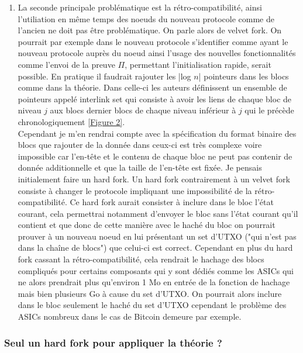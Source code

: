 \documentclass[12pt,a4paper]{article}
\newcommand{\annexe}[2]{\hyperlink{#1}{[Figure #2]}}
\begin{document}
\begin{enumerate}
	\item La seconde principale problématique est la rétro-compatibilité, ainsi l'utiliation en même temps des noeuds du nouveau protocole comme de l'ancien ne doit pas être problématique. On parle alors de velvet fork. On pourrait par exemple dans le nouveau protocole s'identifier comme ayant le nouveau protocole auprès du noeud ainsi l'usage des nouvelles fonctionnalités comme l'envoi de la preuve $\Pi$, permettant l'initialisation rapide, serait possible. En pratique il faudrait rajouter les |log $n$| pointeurs dans les blocs comme dans la théorie. Dans celle-ci les auteurs définissent un ensemble de pointeurs appelé interlink set qui consiste à avoir les liens de chaque bloc de niveau $j$ aux blocs dernier blocs de chaque niveau inférieur à $j$ qui le précède chronologiquement \annexe{22}{2}.\\ %
	Cependant je m'en rendrai compte avec la spécification du format binaire des blocs que rajouter de la donnée dans ceux-ci est très complexe voire impossible car l'en-tête et le contenu de chaque bloc ne peut pas contenir de donnée additionnelle et que la taille de l'en-tête est fixée. Je pensais initialement faire un hard fork. Un hard fork contrairement à un velvet fork consiste à changer le protocole impliquant une impossibilité de la rétro-compatibilité. Ce hard fork aurait consister à inclure dans le bloc l'état courant, cela permettrai notamment d'envoyer le bloc sans l'état courant qu'il contient et que donc de cette manière avec le haché du bloc on pourrait prouver à un nouveau noeud en lui présentant un set d'UTXO ("qui n'est pas dans la chaîne de blocs") que celui-ci est correct. Cependant en plus du hard fork cassant la rétro-compatibilité, cela rendrait le hachage des blocs compliqués pour certains composants qui y sont dédiés comme les ASICs qui ne alors prendrait plus qu'environ 1 Mo en entrée de la fonction de hachage mais bien plusieurs Go à cause du set d'UTXO. %
	On pourrait alors inclure dans le bloc seulement le haché du set d'UTXO cependant le problème des ASICs nombreux dans le cas de Bitcoin demeure par exemple.
	\end{enumerate}
	
	\subsubsection{Seul un hard fork pour appliquer la théorie ?}
	
\end{document}
